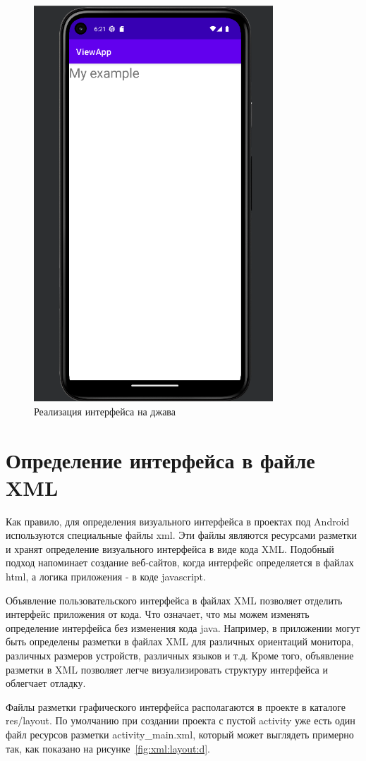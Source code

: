 \begin{figure}[h!tp]
	\centering
	\includegraphics[width=0.8\textwidth]{Screenshot from 2023-03-09 18-21-21.png}
	\caption{Реализация интерфейса на джава}
	\label{fig:view:textview:java}
\end{figure}

\section{Определение интерфейса в файле XML}
Как правило, для определения визуального интерфейса в проектах под
Android используются специальные файлы xml. Эти файлы являются
ресурсами разметки и хранят определение визуального интерфейса в виде
кода XML. Подобный подход напоминает создание веб-сайтов, когда
интерфейс определяется в файлах html, а логика приложения - в коде
javascript.\par
Объявление пользовательского интерфейса в файлах XML позволяет
отделить интерфейс приложения от кода. Что означает, что мы можем
изменять определение интерфейса без изменения кода java. Например, в
приложении могут быть определены разметки в файлах XML для различных
ориентаций монитора, различных размеров устройств, различных языков и
т.д. Кроме того, объявление разметки в XML позволяет легче
визуализировать структуру интерфейса и облегчает отладку.\par
Файлы разметки графического интерфейса располагаются в проекте в
каталоге res/layout. По умолчанию при создании проекта с пустой activity уже
есть один файл ресурсов разметки activity\_main.xml, который может
выглядеть примерно так, как показано на рисунке~\ref{fig:xml:layout:d}.

